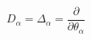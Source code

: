 \begin{equation} 
D_{\alpha} = \Delta_{\alpha} = \frac{\partial}{\partial \theta_{\alpha}} 
\end{equation}


